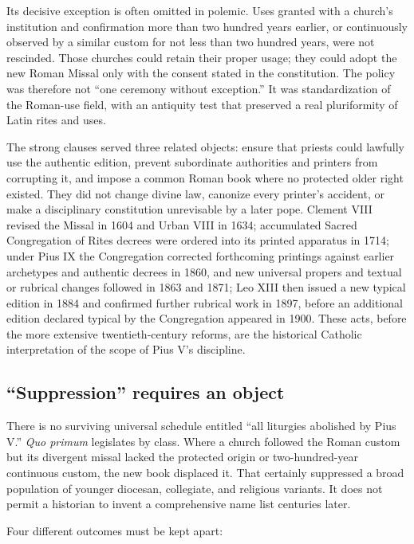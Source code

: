 Its decisive exception is often omitted in polemic. Uses granted with a church's institution and confirmation more than two hundred years earlier, or continuously observed by a similar custom for not less than two hundred years, were not rescinded. Those churches could retain their proper usage; they could adopt the new Roman Missal only with the consent stated in the constitution. The policy was therefore not “one ceremony without exception.” It was standardization of the Roman-use field, with an antiquity test that preserved a real pluriformity of Latin rites and uses.

The strong clauses served three related objects: ensure that priests could lawfully use the authentic edition, prevent subordinate authorities and printers from corrupting it, and impose a common Roman book where no protected older right existed. They did not change divine law, canonize every printer's accident, or make a disciplinary constitution unrevisable by a later pope. Clement VIII revised the Missal in 1604 and Urban VIII in 1634; accumulated Sacred Congregation of Rites decrees were ordered into its printed apparatus in 1714; under Pius IX the Congregation corrected forthcoming printings against earlier archetypes and authentic decrees in 1860, and new universal propers and textual or rubrical changes followed in 1863 and 1871; Leo XIII then issued a new typical edition in 1884 and confirmed further rubrical work in 1897, before an additional edition declared typical by the Congregation appeared in 1900. These acts, before the more extensive twentieth-century reforms, are the historical Catholic interpretation of the scope of Pius V's discipline.

\subsection{“Suppression” requires an object}

There is no surviving universal schedule entitled “all liturgies abolished by Pius V.” \emph{Quo primum} legislates by class. Where a church followed the Roman custom but its divergent missal lacked the protected origin or two-hundred-year continuous custom, the new book displaced it. That certainly suppressed a broad population of younger diocesan, collegiate, and religious variants. It does not permit a historian to invent a comprehensive name list centuries later.

Four different outcomes must be kept apart:

